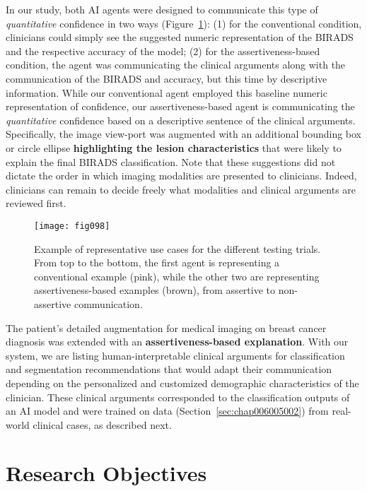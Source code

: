 In our study, both AI agents were designed to communicate this type of {\it quantitative} confidence in two ways (Figure~\ref{fig:fig098}):
(1) for the conventional condition, clinicians could simply see the suggested numeric representation of the BIRADS and the respective accuracy of the model;
(2) for the assertiveness-based condition, the agent was communicating the clinical arguments along with the communication of the BIRADS and accuracy, but this time by descriptive information.
While our conventional agent employed this baseline numeric representation of confidence, our assertiveness-based agent is communicating the {\it quantitative} confidence based on a descriptive sentence of the clinical arguments.
Specifically, the image view-port was augmented with an additional bounding box or circle ellipse {\bf highlighting the lesion characteristics} that were likely to explain the final BIRADS classification.
Note that these suggestions did not dictate the order in which imaging modalities are presented to clinicians.
Indeed, clinicians can remain to decide freely what modalities and clinical arguments are reviewed first.

\begin{figure}[htpb]
\begin{center}
\centering
\texttt{[image: fig098]}
\end{center}
\caption[]{Example of representative use cases for the different testing trials. From top to the bottom, the first agent is representing a conventional example (pink), while the other two are representing assertiveness-based examples (brown), from assertive to non-assertive communication.}
\label{fig:fig098}
\end{figure}

The patient's detailed augmentation for medical imaging on breast cancer diagnosis was extended with an {\bf assertiveness-based explanation}.
With our system, we are listing human-interpretable clinical arguments for classification and segmentation recommendations that would adapt their communication depending on the personalized and customized demographic characteristics of the clinician.
These clinical arguments corresponded to the classification outputs of an AI model and were trained on data (Section~\ref{sec:chap006005002}) from real-world clinical cases, as described next.

\section{Research Objectives}
\label{sec:app005005}

